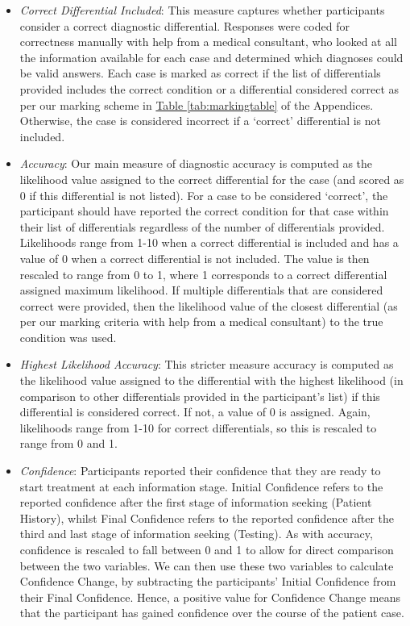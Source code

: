 \documentclass[a4paper, nobind]{templates/ociamthesis}
\begin{document}
\begin{itemize}
\item
  \emph{Correct Differential Included}: This measure captures whether participants consider a correct diagnostic differential. Responses were coded for correctness manually with help from a medical consultant, who looked at all the information available for each case and determined which diagnoses could be valid answers. Each case is marked as correct if the list of differentials provided includes the correct condition or a differential considered correct as per our marking scheme in \hyperref[tab:markingtable]{Table \ref{tab:markingtable}} of the Appendices. Otherwise, the case is considered incorrect if a `correct' differential is not included.
\item
  \emph{Accuracy}: Our main measure of diagnostic accuracy is computed as the likelihood value assigned to the correct differential for the case (and scored as 0 if this differential is not listed). For a case to be considered `correct', the participant should have reported the correct condition for that case within their list of differentials regardless of the number of differentials provided. Likelihoods range from 1-10 when a correct differential is included and has a value of 0 when a correct differential is not included. The value is then rescaled to range from 0 to 1, where 1 corresponds to a correct differential assigned maximum likelihood. If multiple differentials that are considered correct were provided, then the likelihood value of the closest differential (as per our marking criteria with help from a medical consultant) to the true condition was used.
\item
  \emph{Highest Likelihood Accuracy}: This stricter measure accuracy is computed as the likelihood value assigned to the differential with the highest likelihood (in comparison to other differentials provided in the participant's list) if this differential is considered correct. If not, a value of 0 is assigned. Again, likelihoods range from 1-10 for correct differentials, so this is rescaled to range from 0 and 1.
\item
  \emph{Confidence}: Participants reported their confidence that they are ready to start treatment at each information stage. Initial Confidence refers to the reported confidence after the first stage of information seeking (Patient History), whilst Final Confidence refers to the reported confidence after the third and last stage of information seeking (Testing). As with accuracy, confidence is rescaled to fall between 0 and 1 to allow for direct comparison between the two variables. We can then use these two variables to calculate Confidence Change, by subtracting the participants' Initial Confidence from their Final Confidence. Hence, a positive value for Confidence Change means that the participant has gained confidence over the course of the patient case.

\end{itemize}
\end{document}
